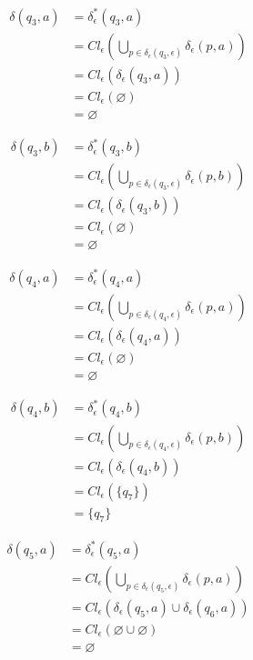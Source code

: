 \documentclass{article}
\begin{document}
\begin{enumerate}
{\begin{enumerate}
{					\begin{align*}
						\delta(q_{3}, a) &= \delta^{*}_{\epsilon}(q_{3}, a) \\
						&= Cl_{\epsilon}(\bigcup_{p \in \delta_{\epsilon}(q_{3}, \epsilon)}
						{\delta_{\epsilon}(p, a)}) \\
						&= Cl_{\epsilon}(\delta_{\epsilon}(q_{3}, a))\\
						&= Cl_{\epsilon}(\varnothing)\\
						&= \varnothing
					\end{align*}

					\begin{align*}
						\delta(q_{3}, b) &= \delta^{*}_{\epsilon}(q_{3}, b) \\
						&= Cl_{\epsilon}(\bigcup_{p \in \delta_{\epsilon}(q_{3}, \epsilon)}
						{\delta_{\epsilon}(p, b)}) \\
						&= Cl_{\epsilon}(\delta_{\epsilon}(q_{3}, b))\\
						&= Cl_{\epsilon}(\varnothing)\\
						&= \varnothing
					\end{align*}

					\begin{align*}
						\delta(q_{4}, a) &= \delta^{*}_{\epsilon}(q_{4}, a) \\
						&= Cl_{\epsilon}(\bigcup_{p \in \delta_{\epsilon}(q_{4}, \epsilon)}
						{\delta_{\epsilon}(p, a)}) \\
						&= Cl_{\epsilon}(\delta_{\epsilon}(q_{4}, a))\\
						&= Cl_{\epsilon}(\varnothing)\\
						&= \varnothing
					\end{align*}

					\begin{align*}
						\delta(q_{4}, b) &= \delta^{*}_{\epsilon}(q_{4}, b) \\
						&= Cl_{\epsilon}(\bigcup_{p \in \delta_{\epsilon}(q_{4}, \epsilon)}
						{\delta_{\epsilon}(p, b)}) \\
						&= Cl_{\epsilon}(\delta_{\epsilon}(q_{4}, b))\\
						&= Cl_{\epsilon}(\{q_{7}\})\\
						&= \{q_{7}\}
					\end{align*}

					\begin{align*}
						\delta(q_{5}, a) &= \delta^{*}_{\epsilon}(q_{5}, a) \\
						&= Cl_{\epsilon}(\bigcup_{p \in \delta_{\epsilon}(q_{5}, \epsilon)}
						{\delta_{\epsilon}(p, a)}) \\
						&= Cl_{\epsilon}(\delta_{\epsilon}(q_{5}, a)
						\cup \delta_{\epsilon}(q_{6}, a))\\
						&= Cl_{\epsilon}(\varnothing \cup \varnothing)\\
						&= \varnothing
					\end{align*}

}
\end{enumerate}}
\end{enumerate}
\end{document}
